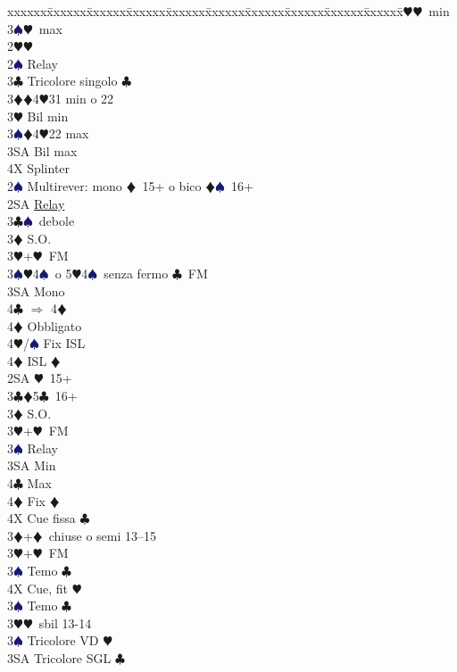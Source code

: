 \documentclass[a4paper,italian]{article}
\newcommand{\BC}{\textcolor{OliveGreen}{$\clubsuit$}}
\newcommand{\BD}{\textcolor{RedOrange}{$\vardiamondsuit$}}
\newcommand{\BH}{\textcolor{Red2}{$\varheartsuit${}}}
\newcommand{\BS}{\textcolor{MidnightBlue}{$\spadesuit${}}}
\newenvironment{bidtable}
{\begin{tabbing}

    xxxxxx\=xxxxxx\=xxxxxx\=xxxxxx\=xxxxxx\=xxxxxx\=xxxxxx\=xxxxxx\=xxxxxx\=xxxxxx\=\kill}
{\end{tabbing} }%
\begin{document}
\begin{multicols}{2}
\begin{bidtable}
        3\BH {}\BH\ min\\
        3\BS {}\BH\ max\-\-\\
        2\BH {}\BH \+\\
        2\BS \> Relay\+\\
        3\BC \> Tricolore singolo \BC \\
        3\BD {}\BD 4\BH 31 min o 22\\
        3\BH \> Bil min\\
        3\BS {}\BD 4\BH 22 max\\
        3SA \> Bil max\\
        4X \> Splinter\-\-\\
        2\BS \> Multirever: mono \BD\ 15+ o bico \BD \BS\ 16+\+\\
        2SA \> \hyperref[multirever]{Relay}\\
        3\BC {}\BS\ debole\\
        3\BD \> S.O.\\
        3\BH {}+\BH\ FM\\
        3\BS {}\BH 4\BS\ o 5\BH 4\BS\ senza fermo \BC\ FM\+\\
        3SA \> Mono\\
        4\BC \> $\Rightarrow$ 4\BD \+\\
        4\BD \> Obbligato\+\\
        4\BH/\BS \> Fix ISL\-\-\\
        4\BD \> ISL \BD \-\-\\
        2SA \BH\ 15+\\
        3\BC {}\BD 5\BC\ 16+\+\\
        3\BD \> S.O.\\
        3\BH {}+\BH\ FM\\
        3\BS \> Relay\+\\
        3SA \> Min\\
        4\BC \> Max\+\\
        4\BD \> Fix \BD \\
        4X \> Cue fissa \BC \-\-\-\\
        3\BD {}+\BD\ chiuse o semi 13--15\+\\
        3\BH {}+\BH\ FM\+\\
        3\BS \> Temo \BC \\
        4X \> Cue, fit \BH \-\\
        3\BS \> Temo \BC \-\\
        3\BH {}\BH\ sbil 13-14\\
        3\BS \> Tricolore VD \BH \\
        3SA \> Tricolore SGL \BC \-
    \end{bidtable}


\end{multicols}
\end{document}
